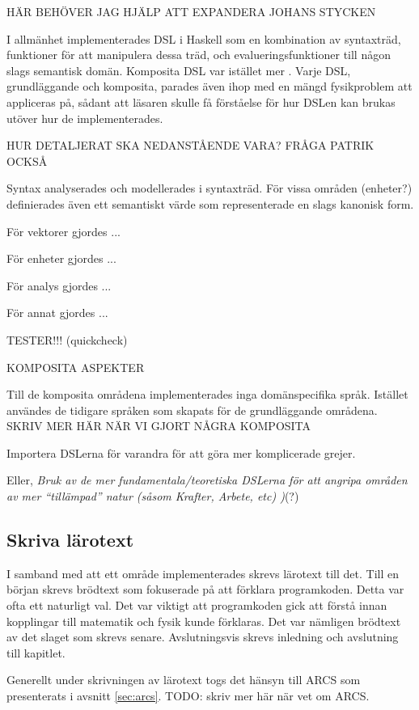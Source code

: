 \begin{binge}
HÄR BEHÖVER JAG HJÄLP ATT EXPANDERA JOHANS STYCKEN

I allmänhet implementerades DSL i Haskell som en kombination av
syntaxträd, funktioner för att manipulera dessa träd, och
evalueringsfunktioner till någon slags semantisk domän. Komposita
DSL var istället mer . Varje DSL, grundläggande och
komposita, parades även ihop med en mängd fysikproblem att appliceras
på, sådant att läsaren skulle få förståelse för hur DSLen kan brukas
utöver hur de implementerades.

HUR DETALJERAT SKA NEDANSTÅENDE VARA? FRÅGA PATRIK OCKSÅ

Syntax analyserades och modellerades i syntaxträd. För vissa områden
(enheter?) definierades även ett semantiskt värde som representerade
en slags kanonisk form.

För vektorer gjordes ...

För enheter gjordes ...

För analys gjordes ...

För annat gjordes ...


TESTER!!! (quickcheck)

KOMPOSITA ASPEKTER

Till de komposita områdena implementerades inga domänspecifika språk. Istället användes de tidigare språken som skapats för de grundläggande områdena. SKRIV MER HÄR NÄR VI GJORT NÅGRA KOMPOSITA

Importera DSLerna för varandra för att göra mer komplicerade grejer.

Eller, \emph{Bruk av de mer fundamentala/teoretiska DSLerna för att
  angripa områden av mer ``tillämpad'' natur (såsom Krafter, Arbete,
  etc) )}(?)

\subsection{Skriva lärotext}

I samband med att ett område implementerades skrevs lärotext till det. Till en
början skrevs brödtext som fokuserade på att förklara programkoden. Detta var
ofta ett naturligt val. Det var viktigt att programkoden gick att förstå innan
kopplingar till matematik och fysik kunde förklaras. Det var nämligen brödtext
av det slaget som skrevs senare. Avslutningsvis skrevs inledning och avslutning
till kapitlet.

Generellt under skrivningen av lärotext togs det hänsyn till ARCS som
presenterats i avsnitt \ref{sec:arcs}. TODO: skriv mer här när vet om ARCS.


\end{binge}

